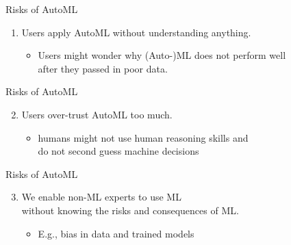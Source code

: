 \begin{frame}[c]{Risks of AutoML}

\begin{enumerate}
	\item Users apply AutoML \alert{without understanding} anything.
	\begin{itemize}
		\item Users might wonder why (Auto-)ML does not perform well\\ after they passed in poor data. 
	\end{itemize}
\end{enumerate}

\end{frame}
\begin{frame}[c]{Risks of AutoML}

\begin{enumerate}\setcounter{enumi}{1}
	\item Users \alert{over-trust} AutoML too much.
	\begin{itemize}
		\item humans might not use human reasoning skills and\\ do not second guess machine decisions
	\end{itemize}
\end{enumerate}

\end{frame}
\begin{frame}[c]{Risks of AutoML}

\begin{enumerate}\setcounter{enumi}{2}
	\item We enable non-ML experts to use ML\\ \alert{without knowing the risks and consequences} of ML.
	\begin{itemize}
		\item E.g., bias in data and trained models
	\end{itemize}
\end{enumerate}

\end{frame}
